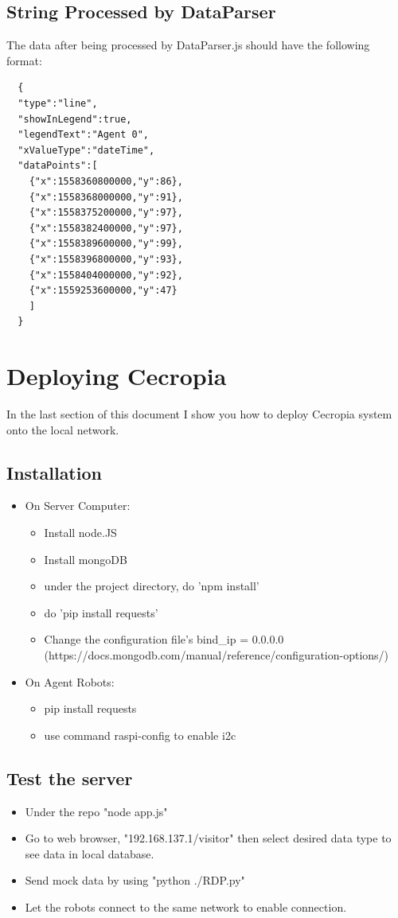 \documentclass{article}
\begin{document}
\subsection{String Processed by DataParser} The data after being processed by DataParser.js should have the following format:
\begin{lstlisting}
  {
  "type":"line",
  "showInLegend":true,
  "legendText":"Agent 0",
  "xValueType":"dateTime",
  "dataPoints":[
    {"x":1558360800000,"y":86},
    {"x":1558368000000,"y":91},
    {"x":1558375200000,"y":97},
    {"x":1558382400000,"y":97},
    {"x":1558389600000,"y":99},
    {"x":1558396800000,"y":93},
    {"x":1558404000000,"y":92},
    {"x":1559253600000,"y":47}
    ]
  }
\end{lstlisting}

\newpage
\section{Deploying Cecropia}
In the last section of this document I show you how to deploy Cecropia system onto the local network.
\subsection{Installation}
\begin{itemize}
  \item On Server Computer:
  \begin{itemize}
    \item Install node.JS
    \item Install mongoDB
    \item under the project directory, do 'npm install'
    \item do 'pip install requests'
    \item Change the configuration file's bind\_ip = 0.0.0.0 (https://docs.mongodb.com/manual/reference/configuration-options/)
  \end{itemize}
  \item On Agent Robots:
  \begin{itemize}
    \item pip install requests
    \item use command raspi-config to enable i2c
  \end{itemize}
\end{itemize}

\subsection{Test the server}
\begin{itemize}
  \item Under the repo "node app.js"
  \item Go to web browser, "192.168.137.1/visitor" then select desired data type to see data in local database.
  \item Send mock data by using "python ./RDP.py"
  \item Let the robots connect to the same network to enable connection.
\end{itemize}
\end{document}
